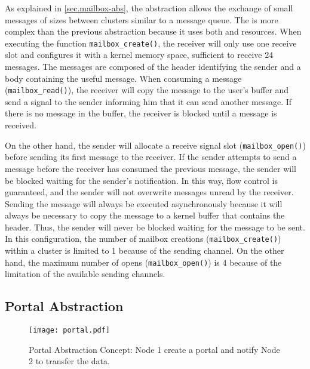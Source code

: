 				As explained in \autoref{sec.mailbox-abs}, the \mailbox abstraction
				allows the exchange of small messages of sizes between clusters similar
				to a \posix message queue.
				The \mailbox is more complex than the previous abstraction because it
				uses both \dnoc and \cnoc resources.
				When executing the function \texttt{mailbox\_create()}, the receiver
				will only use one \dnoc receive slot and configures it with a kernel
				memory space, sufficient to receive 24 messages.
				The messages are composed of the header identifying the sender
				and a body containing the useful message.
				When consuming a message (\texttt{mailbox\_read()}), the receiver
				will copy the message to the user's buffer and send a signal
				to the sender informing him that it can send another message.
				If there is no message in the buffer, the receiver is blocked
				until a message is received.

				On the other hand, the sender will allocate a receive signal slot (\texttt{mailbox\_open()})
				before sending its first message to the receiver.
				If the sender attempts to send a message before the receiver has consumed
				the previous message, the sender will be blocked waiting for the sender's notification.
				In this way, flow control is guaranteed, and the sender will not overwrite
				messages unread by the receiver.
				Sending the message will always be executed asynchronously
				because it will always be necessary to copy the message to
				a kernel buffer that contains the header.
				Thus, the sender will never be blocked waiting for the message to be sent.
				In this configuration, the number of mailbox creations (\texttt{mailbox\_create()})
				within a cluster is limited to 1 because of the \cnoc sending channel.
				On the other hand, the maximum number of opens (\texttt{mailbox\_open()}) is
				4 because of the limitation of the available \dnoc sending channels.

		\subsection{Portal Abstraction}
		\label{sec.portal-abs}

			\begin{figure}[!tb]
				\centering%
				\caption{Portal Abstraction Concept: Node 1 create a portal and notify Node 2 to transfer the data.}%
				\label{fig:conpt_portal}%
				\texttt{[image: portal.pdf]}%
			\end{figure}

